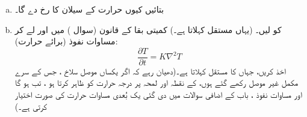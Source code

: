 \begin{enumerate}[a.]
\item
بتائیں  کیوں حرارت کے  سیلان کا رخ دے گا۔
\item
{} کو    لیں۔ (یہاں مستقل  کہلاتا ہے۔) کمیتی بقا کے قانون  (سوال ) میں  اور  لے کر مساوات نفوذ (برائے حرارت):
\[\frac{\partial T}{\partial t}=K\nabla^2 T\]
اخذ کریں، جہاں    کا مستقل کہلاتا ہے۔(دھیان رہے کہ  اگر یکساں موصل سلاخ ، جس کے سرے مکمل غیر موصل رکھے گئے ہوں،  کے نقطہ   اور لمحہ  پر  درجہ حرارت کو    ظاہر کرتا ہو ، تب  ہو گا اور مساوات نفوذ ، باب  کے  اضافی سوالات میں دی گئی یک بُعدی مساوات حرارت   کی صورت اختیار کرتی ہے۔)
\end{enumerate}

